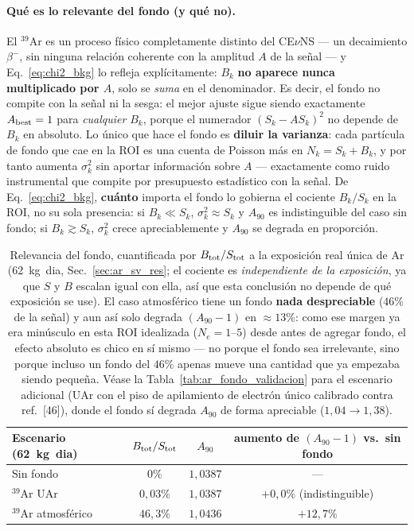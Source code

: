 \documentclass[11pt,a4paper]{article}
\begin{document}
\paragraph{Qu\'e es lo relevante del fondo (y qu\'e no).} El $^{39}$Ar es un
proceso f\'isico completamente distinto del CE$\nu$NS --- un decaimiento
$\beta^{-}$, sin ninguna relaci\'on coherente con la amplitud $A$ de la se\~nal
--- y Eq.~\eqref{eq:chi2_bkg} lo refleja expl\'icitamente: $B_{k}$ \textbf{no
aparece nunca multiplicado por $A$}, solo se \emph{suma} en el denominador. Es
decir, el fondo no compite con la se\~nal ni la sesga: el mejor ajuste sigue
siendo exactamente $A_{\rm best}=1$ para \emph{cualquier} $B_{k}$, porque el
numerador $(S_{k}-AS_{k})^{2}$ no depende de $B_{k}$ en absoluto. Lo \'unico que
hace el fondo es \textbf{diluir la varianza}: cada part\'icula de fondo que cae
en la ROI es una cuenta de Poisson m\'as en $N_{k}=S_{k}+B_{k}$, y por tanto
aumenta $\sigma_{k}^{2}$ sin aportar informaci\'on sobre $A$ --- exactamente como
ruido instrumental que compite por presupuesto estad\'istico con la se\~nal. De
Eq.~\eqref{eq:chi2_bkg}, \textbf{cu\'anto} importa el fondo lo gobierna el
cociente $B_{k}/S_{k}$ en la ROI, no su sola presencia: si $B_{k}\ll S_{k}$,
$\sigma_{k}^{2}\approx S_{k}$ y $A_{90}$ es indistinguible del caso sin fondo; si
$B_{k}\gtrsim S_{k}$, $\sigma_{k}^{2}$ crece apreciablemente y $A_{90}$ se
degrada en proporci\'on.

\begin{table}[h]
\centering
\begin{tabular}{@{}lccc@{}}
\toprule
Escenario (\SI{62}{kg.dia}) & $B_{\rm tot}/S_{\rm tot}$ & $A_{90}$ & aumento de $(A_{90}-1)$ vs.\ sin fondo \\
\midrule
Sin fondo        & $0\%$     & $1{,}0387$ & --- \\
$^{39}$Ar UAr    & $0{,}03\%$ & $1{,}0387$ & $+0{,}0\%$ (indistinguible) \\
$^{39}$Ar atmosf\'erico & $46{,}3\%$ & $1{,}0436$ & $+12{,}7\%$ \\
\bottomrule
\end{tabular}
\caption{Relevancia del fondo, cuantificada por $B_{\rm tot}/S_{\rm tot}$ a la
exposici\'on real \'unica de Ar (\SI{62}{kg.dia}, Sec.~\ref{sec:ar_sv_res}; el
cociente es \emph{independiente de la exposici\'on}, ya que $S$ y $B$ escalan
igual con ella, as\'i que esta conclusi\'on no depende de qu\'e exposici\'on se
use). El caso atmosf\'erico tiene un fondo \textbf{nada despreciable} ($46\%$ de
la se\~nal) y aun as\'i solo degrada $(A_{90}-1)$ en $\approx13\%$: como ese
margen ya era min\'usculo en esta ROI idealizada ($N_{e}=1$--$5$) desde antes de
agregar fondo, el efecto absoluto es chico en s\'i mismo --- no porque el fondo
sea irrelevante, sino porque incluso un fondo del $46\%$ apenas mueve una
cantidad que ya empezaba siendo peque\~na. V\'ease la Tabla~\ref{tab:ar_fondo_validacion}
para el escenario adicional (UAr con el piso de apilamiento de electr\'on \'unico
calibrado contra ref.\ [46]), donde el fondo s\'i degrada $A_{90}$ de forma
apreciable ($1{,}04\to1{,}38$).}
\label{tab:relevancia_fondo}
\end{table}
\end{document}

